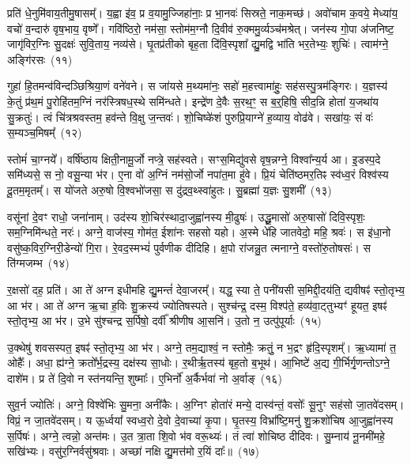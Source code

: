 प्रति॑ धे॒नुमि॑वाय॒तीमु॒षासम्᳚। य॒ह्वा इ॑व॒ प्र व॒यामु॒ज्जिहा॑नाः॒ प्र भा॒नवः॑ सिस्रते॒ नाक॒मच्छ॑। अवो॑चाम क॒वये॒ मेध्या॑य॒ वचो॑ व॒न्दारु॑ वृष॒भाय॒ वृष्णे᳚। गवि॑ष्ठिरो॒ नम॑सा॒ स्तोम॑म॒ग्नौ दि॒वीव॑ रु॒क्ममु॒र्व्यञ्च॑मश्रेत्। जन॑स्य गो॒पा अ॑जनिष्ट॒ जागृ॑विर॒ग्निः सु॒दक्षः॑ सुवि॒ताय॒ नव्य॑से। घृ॒तप्र॑तीको बृह॒ता दि॑वि॒स्पृशा᳚ द्यु॒मद्वि भा॑ति भर॒तेभ्यः॒ शुचिः॑। त्वाम॑ग्ने॒ अङ्गि॑रसः~(११)

गुहा॑ हि॒तमन्व॑विन्दञ्छिश्रिया॒णं वने॑वने। स जा॑यसे म॒थ्यमा॑नः॒ सहो॑ म॒हत्त्वामा॑हुः॒ सह॑सस्पु॒त्रम॑ङ्गिरः। य॒ज्ञस्य॑ के॒तुं प्र॑थ॒मं पु॒रोहि॑तम॒ग्निं नर॑स्त्रिषध॒स्थे समि॑न्धते। इन्द्रे॑ण दे॒वैः स॒रथ॒ꣳ॒ स ब॒र्॒\mbox{}हिषि॒ सीद॒न्नि होता॑ य॒जथा॑य सु॒क्रतुः॑। त्वं चि॑त्रश्रवस्तम॒ हव॑न्ते वि॒क्षु ज॒न्तवः॑। शो॒चिष्के॑शं पुरुप्रि॒याग्ने॑ ह॒व्याय॒ वोढ॑वे। सखा॑यः॒ सं वः॑ स॒म्यञ्च॒मिषम्᳚~(१२)

स्तोमं॑ चा॒ग्नये᳚। वर्\mbox{}षि॑ष्ठाय क्षिती॒नामू॒र्जो नप्त्रे॒ सह॑स्वते। सꣳस॒मिद्यु॑वसे वृष॒न्नग्ने॒ विश्वा᳚न्य॒र्य आ। इ॒डस्प॒दे समि॑ध्यसे॒ स नो॒ वसू॒न्या भ॑र। ए॒ना वो॑ अ॒ग्निं नम॑सो॒र्जो नपा॑त॒मा हु॑वे। प्रि॒यं चेति॑ष्ठमर॒तिꣴ स्व॑ध्व॒रं विश्व॑स्य दू॒तम॒मृतम्᳚। स यो॑जते अरु॒षो वि॒श्वभो॑जसा॒ स दु॑द्रव॒थ्\-स्वा॑हुतः। सु॒ब्रह्मा॑ य॒ज्ञः सु॒शमी᳚~(१३)

वसू॑नां दे॒वꣳ राधो॒ जना॑नाम्। उद॑स्य शो॒चिर॑स्थादा॒जुह्वा॑नस्य मी॒ढुषः॑। उद्धू॒मासो॑ अरु॒षासो॑ दिवि॒स्पृशः॒ सम॒ग्निमि॑न्धते॒ नरः॑। अग्ने॒ वाज॑स्य॒ गोम॑त॒ ईशा॑नः सहसो यहो। अ॒स्मे धे॑हि जातवेदो॒ महि॒ श्रवः॑। स इ॑धा॒नो वसु॑ष्क॒विर॒ग्निरी॒डेन्यो॑ गि॒रा। रे॒वद॒स्मभ्यं॑ पुर्वणीक दीदिहि। क्ष॒पो रा॑जन्नु॒त त्मनाग्ने॒ वस्तो॑रु॒तोषसः॑। स ति॑ग्मजम्भ~(१४)

र॒क्षसो॑ दह॒ प्रति॑। आ ते॑ अग्न इधीमहि द्यु॒मन्तं॑ देवा॒जरम्᳚। यद्ध॒ स्या ते॒ पनी॑यसी स॒मिद्दी॒दय॑ति॒ द्यवीषꣴ॑ स्तो॒तृभ्य॒ आ भ॑र। आ ते॑ अग्न ऋ॒चा ह॒विः शु॒क्रस्य॑ ज्योतिषस्पते। सुश्च॑न्द्र॒ दस्म॒ विश्प॑ते॒ हव्य॑वा॒ट्तुभ्यꣳ॑ हूयत॒ इषꣴ॑ स्तो॒तृभ्य॒ आ भ॑र। उ॒भे सु॑श्चन्द्र स॒र्पिषो॒ दर्वी᳚ श्रीणीष आ॒सनि॑। उ॒तो न॒ उत्पु॑पूर्याः~(१५)

उ॒क्थेषु॑ शवसस्पत॒ इषꣴ॑ स्तो॒तृभ्य॒ आ भ॑र। अग्ने॒ तम॒द्याश्वं॒ न स्तोमैः॒ क्रतुं॒ न भ॒द्रꣳ हृ॑दि॒स्पृशम्᳚। ऋ॒ध्यामा॑ त॒ ओहैः᳚। अधा॒ ह्य॑ग्ने॒ क्रतो᳚र्भ॒द्रस्य॒ दक्ष॑स्य सा॒धोः। र॒थीर्\mbox{}ऋ॒तस्य॑ बृह॒तो ब॒भूथ॑। आ॒भिष्टे॑ अ॒द्य गी॒र्भिर्गृ॒णन्तो\-ऽग्ने॒ दाशे॑म। प्र ते॑ दि॒वो न स्त॑नयन्ति॒ शुष्माः᳚। ए॒भिर्नो॑ अ॒र्कैर्भवा॑ नो अ॒र्वाङ्~(१६)

सुव॒र्न ज्योतिः॑। अग्ने॒ विश्वे॑भिः सु॒मना॒ अनी॑कैः। अ॒ग्निꣳ होता॑रं मन्ये॒ दास्व॑न्तं॒ वसोः᳚ सू॒नुꣳ सह॑सो जा॒तवे॑दसम्। विप्रं॒ न जा॒तवे॑दसम्। य ऊ॒र्ध्वया᳚ स्वध्व॒रो दे॒वो दे॒वाच्या॑ कृ॒पा। घृ॒तस्य॒ विभ्रा᳚ष्टि॒मनु॑ शु॒क्रशो॑चिष आ॒जुह्वा॑नस्य स॒र्पिषः॑। अग्ने॒ त्वन्नो॒ अन्त॑मः। उ॒त त्रा॒ता शि॒वो भ॑व वरू॒थ्यः॑। तं त्वा॑ शोचिष्ठ दीदिवः। सु॒म्नाय॑ नू॒नमी॑महे॒ सखि॑भ्यः। वसु॑र॒ग्निर्वसु॑श्रवाः। अच्छा॑ नक्षि द्यु॒मत्त॑मो र॒यिं दाः᳚॥~(१७)

